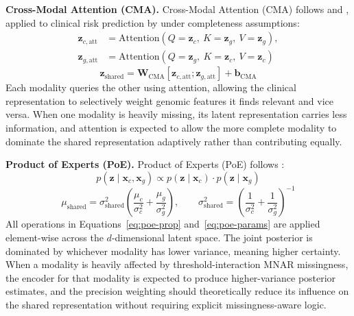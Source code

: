 \documentclass[final,3p,times,authoryear]{elsarticle}
\begin{document}
\textbf{Cross-Modal Attention (CMA).} Cross-Modal Attention (CMA) follows \citet{vaswani2017attention} and \citet{tsai2019multimodal}, applied to clinical risk prediction by \citet{li2023mavae} under completeness assumptions:
\begin{equation}
\begin{split}
\mathbf{z}_{c,\text{att}} &= \text{Attention}(Q=\mathbf{z}_c,\ K=\mathbf{z}_g,\ V=\mathbf{z}_g), \\
\mathbf{z}_{g,\text{att}} &= \text{Attention}(Q=\mathbf{z}_g,\ K=\mathbf{z}_c,\ V=\mathbf{z}_c)
\end{split}
\label{eq:cma-att}
\end{equation}
\begin{equation}
\mathbf{z}_{\text{shared}} = \mathbf{W}_{\text{CMA}}[\mathbf{z}_{c,\text{att}} ; \mathbf{z}_{g,\text{att}}] + \mathbf{b}_{\text{CMA}}
\label{eq:cma-proj}
\end{equation}
Each modality queries the other using attention, allowing the clinical representation to selectively weight genomic features it finds relevant and vice versa. When one modality is heavily missing, its latent representation carries less information, and attention is expected to allow the more complete modality to dominate the shared representation adaptively rather than contributing equally.

\textbf{Product of Experts (PoE).} Product of Experts (PoE) follows \citet{wu2018multimodal}:
\begin{equation}
p(\mathbf{z} \mid \mathbf{x}_c, \mathbf{x}_g) \propto p(\mathbf{z} \mid \mathbf{x}_c) \cdot p(\mathbf{z} \mid \mathbf{x}_g)
\label{eq:poe-prop}
\end{equation}
\begin{equation}
\mu_{\text{shared}} = \sigma_{\text{shared}}^2 \left( \frac{\mu_c}{\sigma_c^2} + \frac{\mu_g}{\sigma_g^2} \right), \qquad \sigma_{\text{shared}}^2 = \left( \frac{1}{\sigma_c^2} + \frac{1}{\sigma_g^2} \right)^{-1}
\label{eq:poe-params}
\end{equation}
All operations in Equations~\ref{eq:poe-prop} and~\ref{eq:poe-params} are applied element-wise across the $d$-dimensional latent space.
The joint posterior is dominated by whichever modality has lower variance, meaning higher certainty. When a modality is heavily affected by threshold-interaction MNAR missingness, the encoder for that modality is expected to produce higher-variance posterior estimates, and the precision weighting should theoretically reduce its influence on the shared representation without requiring explicit missingness-aware logic.
\end{document}
